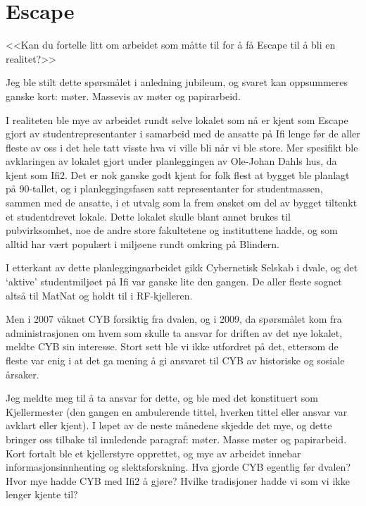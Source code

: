 \chapter{Escape}
\label{chap:escape}

\author{Skrevet av Magnus Johansen}

<<Kan du fortelle litt om arbeidet som måtte til for å få Escape til å bli en realitet?>>

Jeg ble stilt dette spørsmålet i anledning jubileum, og svaret kan oppsummeres ganske kort: møter. Massevis av møter og papirarbeid.

I realiteten ble mye av arbeidet rundt selve lokalet som nå er kjent som Escape gjort av studentrepresentanter i samarbeid med de ansatte på Ifi lenge før de aller fleste av oss i det hele tatt visste hva vi ville bli når vi ble store. Mer spesifikt ble avklaringen av lokalet gjort under planleggingen av Ole-Johan Dahls hus, da kjent som Ifi2. Det er nok ganske godt kjent for folk flest at bygget ble planlagt på 90-tallet, og i planleggingsfasen satt representanter for studentmassen, sammen med de ansatte, i et utvalg som la frem ønsket om del av bygget tiltenkt et studentdrevet lokale. Dette lokalet skulle blant annet brukes til pubvirksomhet, noe de andre store fakultetene og instituttene hadde, og som alltid har vært populært i miljøene rundt omkring på Blindern.

I etterkant av dette planleggingsarbeidet gikk Cybernetisk Selskab i dvale, og det `aktive' studentmiljøet på Ifi var ganske lite den gangen. De aller fleste sognet altså til MatNat og holdt til i RF-kjelleren. 

Men i 2007 våknet CYB forsiktig fra dvalen, og i 2009, da spørsmålet kom fra administrasjonen om hvem som skulle ta ansvar for driften av det nye lokalet, meldte CYB sin interesse. Stort sett ble vi ikke utfordret på det, ettersom de fleste var enig i at det ga mening å gi ansvaret til CYB av historiske og sosiale årsaker.

Jeg meldte meg til å ta ansvar for dette, og ble med det konstituert som Kjellermester (den gangen en ambulerende tittel, hverken tittel eller ansvar var avklart eller kjent). I løpet av de neste månedene skjedde det mye, og dette bringer oss tilbake til innledende paragraf: møter. Masse møter og papirarbeid. Kort fortalt ble et kjellerstyre opprettet, og mye av arbeidet innebar informasjonsinnhenting og slektsforskning. Hva gjorde CYB egentlig før dvalen? Hvor mye hadde CYB med Ifi2 å gjøre? Hvilke tradisjoner hadde vi som vi ikke lenger kjente til?

